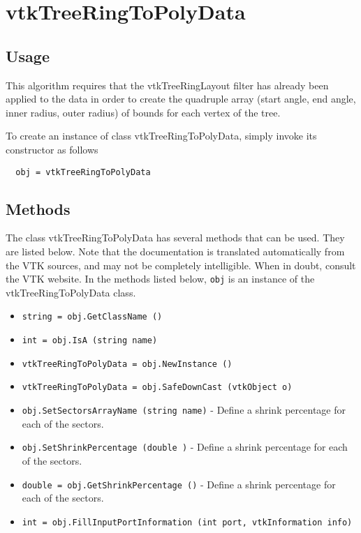\section{vtkTreeRingToPolyData}

\subsection{Usage}

 This algorithm requires that the vtkTreeRingLayout filter has already
 been applied to the data in order to create the quadruple array 
 (start angle, end angle, inner radius, outer radius) of bounds 
 for each vertex of the tree.

To create an instance of class vtkTreeRingToPolyData, simply
invoke its constructor as follows
\begin{verbatim}
  obj = vtkTreeRingToPolyData
\end{verbatim}
\subsection{Methods}

The class vtkTreeRingToPolyData has several methods that can be used.
  They are listed below.
Note that the documentation is translated automatically from the VTK sources,
and may not be completely intelligible.  When in doubt, consult the VTK website.
In the methods listed below, \verb|obj| is an instance of the vtkTreeRingToPolyData class.
\begin{itemize}
\item  \verb|string = obj.GetClassName ()|

\item  \verb|int = obj.IsA (string name)|

\item  \verb|vtkTreeRingToPolyData = obj.NewInstance ()|

\item  \verb|vtkTreeRingToPolyData = obj.SafeDownCast (vtkObject o)|

\item  \verb|obj.SetSectorsArrayName (string name)| -  Define a shrink percentage for each of the sectors.

\item  \verb|obj.SetShrinkPercentage (double )| -  Define a shrink percentage for each of the sectors.

\item  \verb|double = obj.GetShrinkPercentage ()| -  Define a shrink percentage for each of the sectors.

\item  \verb|int = obj.FillInputPortInformation (int port, vtkInformation info)|

\end{itemize}
